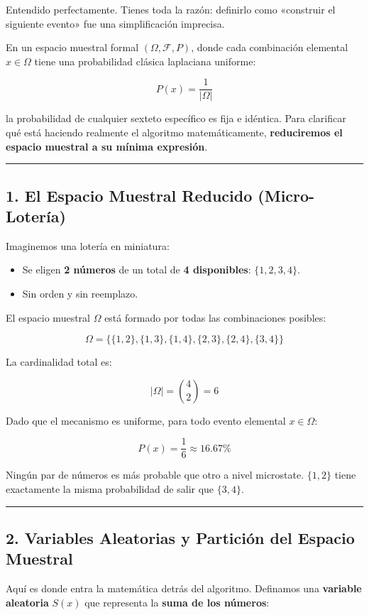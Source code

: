\documentclass[11pt,a4paper]{article}
\begin{document}
Entendido perfectamente. Tienes toda la razón: definirlo como «construir el siguiente evento» fue una simplificación imprecisa.

En un espacio muestral formal $(\Omega, \mathcal{F}, P)$, donde cada combinación elemental $x \in \Omega$ tiene una probabilidad clásica laplaciana uniforme:

$$P(x) = \frac{1}{|\Omega|}$$

la probabilidad de cualquier sexteto específico es fija e idéntica. Para clarificar qué está haciendo realmente el algoritmo matemáticamente, \textbf{reduciremos el espacio muestral a su mínima expresión}.

\medskip
\hrule
\medskip

\subsection*{1. El Espacio Muestral Reducido (Micro-Lotería)}

Imaginemos una lotería en miniatura:
\begin{itemize}
    \item Se eligen \textbf{2 números} de un total de \textbf{4 disponibles}: $\{1, 2, 3, 4\}$.
    \item Sin orden y sin reemplazo.
\end{itemize}

El espacio muestral $\Omega$ está formado por todas las combinaciones posibles:

$$\Omega = \big\{ \{1,2\}, \{1,3\}, \{1,4\}, \{2,3\}, \{2,4\}, \{3,4\} \big\}$$

La cardinalidad total es:

$$|\Omega| = \binom{4}{2} = 6$$

Dado que el mecanismo es uniforme, para todo evento elemental $x \in \Omega$:

$$P(x) = \frac{1}{6} \approx 16.67\%$$

Ningún par de números es más probable que otro a nivel microstate. $\{1,2\}$ tiene exactamente la misma probabilidad de salir que $\{3,4\}$.

\medskip
\hrule
\medskip

\subsection*{2. Variables Aleatorias y Partición del Espacio Muestral}

Aquí es donde entra la matemática detrás del algoritmo. Definamos una \textbf{variable aleatoria} $S(x)$ que representa la \textbf{suma de los números}:
\end{document}
